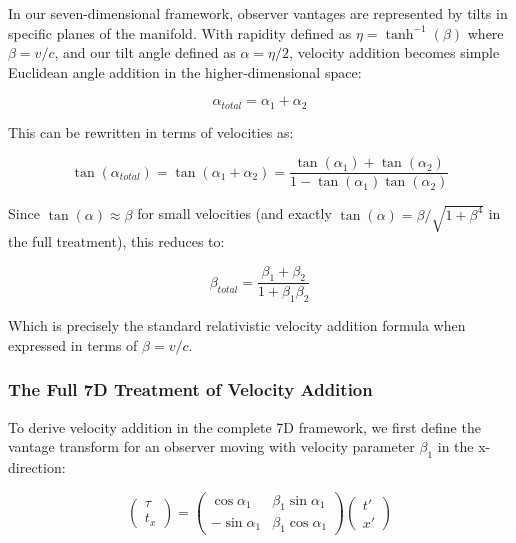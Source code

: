 \documentclass{article}
\begin{document}
In our seven-dimensional framework, observer vantages are represented by tilts in specific planes of the manifold. With rapidity defined as $\eta = \tanh^{-1}(\beta)$ where $\beta = v/c$, and our tilt angle defined as $\alpha = \eta/2$, velocity addition becomes simple Euclidean angle addition in the higher-dimensional space:

\begin{equation}
\alpha_{total} = \alpha_1 + \alpha_2
\end{equation}

This can be rewritten in terms of velocities as:

\begin{equation}
\tan(\alpha_{total}) = \tan(\alpha_1 + \alpha_2) = \frac{\tan(\alpha_1) + \tan(\alpha_2)}{1 - \tan(\alpha_1)\tan(\alpha_2)}
\end{equation}

Since $\tan(\alpha) \approx \beta$ for small velocities (and exactly $\tan(\alpha) = \beta/\sqrt{1+\beta^4}$ in the full treatment), this reduces to:

\begin{equation}
\beta_{total} = \frac{\beta_1 + \beta_2}{1 + \beta_1\beta_2}
\end{equation}

Which is precisely the standard relativistic velocity addition formula when expressed in terms of $\beta = v/c$.

\subsubsection{The Full 7D Treatment of Velocity Addition}

To derive velocity addition in the complete 7D framework, we first define the vantage transform for an observer moving with velocity parameter $\beta_1$ in the x-direction:

\begin{equation}
\begin{pmatrix} \tau \\ t_x \end{pmatrix} = 
\begin{pmatrix} \cos\alpha_1 & \beta_1\sin\alpha_1 \\ -\sin\alpha_1 & \beta_1\cos\alpha_1 \end{pmatrix}
\begin{pmatrix} t' \\ x' \end{pmatrix}
\end{equation}
\end{document}

